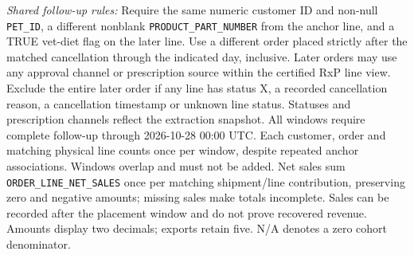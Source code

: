 \begin{table}[!htbp]
\begin{minipage}{\linewidth}
\textit{Shared follow-up rules:} Require the same numeric customer ID and non-null \texttt{PET\_ID},
a different nonblank \texttt{PRODUCT\_PART\_NUMBER} from the anchor line,
and a TRUE vet-diet flag on the later line. Use a different order
placed strictly after the matched cancellation through the indicated day, inclusive.
Later orders may use any approval channel or prescription source within the certified RxP line view.
Exclude the entire later order if any line has status X, a recorded cancellation reason,
a cancellation timestamp or unknown line status. Statuses and prescription channels reflect
the extraction snapshot. All windows require complete follow-up through 2026-10-28 00:00 UTC.
Each customer, order and matching physical line counts once per window, despite repeated
anchor associations. Windows overlap and must not be added. Net sales sum \texttt{ORDER\_LINE\_NET\_SALES} once per matching shipment/line contribution, preserving zero and negative amounts; missing sales make totals incomplete.
Sales can be recorded after the placement window and do not prove recovered revenue.
Amounts display two decimals; exports retain five. N/A denotes a zero cohort denominator.
\end{minipage}
\end{table}
